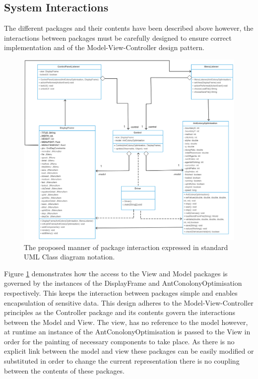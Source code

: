\subsection{System Interactions}

The different packages and their contents have been described above however, the interactions between packages must be carefully designed to ensure correct implementation and of the Model-View-Controller design pattern. 

\clearpage
\begin{figure}
\includegraphics[scale=0.22]{Images/chapter4/overallClassinteraction}
\caption[Package Interaction Diagram]{The proposed manner of package interaction expressed in standard UML Class diagram notation.}
\label{fig:interacttion}
\end{figure}
\clearpage

Figure \ref{fig:interacttion} demonstrates how the access to the View and Model packages is governed by the instances of the DisplayFrame and AntConolonyOptimisation respectively. This keeps the interaction between packages simple and enables encapsulation of sensitive data. This design adheres to the Model-View-Controller principles as the Controller package and its contents govern the interactions between the Model and View. The view, has no reference to the model however, at runtime an instance of the AntConolonyOptimisation is passed to the View in order for the painting of necessary components to take place. As there is no explicit link between the model and view these packages can be easily modified or substituted in order to change the current representation there is no coupling between the contents of these packages.

